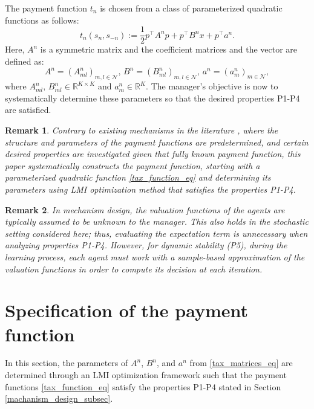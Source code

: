 \documentclass[twocolumn]{autart}
\newtheorem{remark}{Remark}
\begin{document}
\par
The payment function $t_n$ is chosen from a class of parameterized quadratic functions as  follows:
\begin{equation}\label{tax_function_eq}
t_n(s_n, s_{-n}):=\frac{1}{2}p^\top A^n p+p^\top B^n x+p^\top a^n.
\end{equation}
Here, $A^n$ is a symmetric matrix and the coefficient matrices and the vector are defined as:
\begin{equation}\label{tax_matrices_eq}
	A^n= \left(A_{ml}^n\right)_{m,l\in\mathcal{N}}, \, B^n= \left(B_{ml}^n\right)_{m,l\in\mathcal{N}}, \, a^n=(a_m^n)_{m\in\mathcal{N}},
\end{equation}
where $A_{ml}^n,\,B_{ml}^n\in\mathbb{R}^{K\times K}$ and $a_m^n\in\mathbb{R}^K$. The manager's objective is now to systematically determine these parameters so that the desired properties P1-P4 are satisfied.
\begin{remark}
Contrary to existing mechanisms in the literature \cite{kakhbod2012efficient, farhadi2018surrogate, eslami2022incentive}, where the structure and parameters of the payment functions are predetermined, and certain desired properties are investigated given that fully known payment function, this paper systematically constructs the payment function, starting with a parameterized quadratic function \eqref{tax_function_eq} and determining its parameters using LMI optimization method that satisfies the properties P1-P4.
\end{remark}
\begin{remark}
In mechanism design, the valuation functions of the agents are typically assumed to be unknown to the manager. This also holds in the stochastic setting considered here; thus, evaluating the expectation term is unnecessary when analyzing properties P1-P4. However, for dynamic stability (P5), during the learning process, each agent must work with a sample-based approximation of the valuation functions in order to compute its decision at each iteration.
\end{remark}
\section{Specification of the payment function}\label{sec4}
In this section, the parameters of $A^n$, $B^n$, and $a^n$ from \eqref{tax_matrices_eq} are determined through an LMI optimization framework  such that the payment functions \eqref{tax_function_eq} satisfy the properties P1-P4 stated in Section \ref{machanism_design_subsec}.
\end{document}
